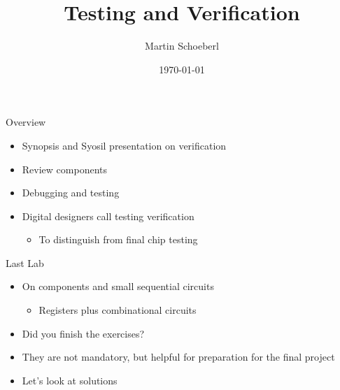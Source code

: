 

\newif\ifbook


\title{Testing and Verification}
\author{Martin Schoeberl}
\date{\today}



\begin{frame}
\titlepage
\end{frame}

\begin{frame}[fragile]{Overview}
\begin{itemize}
\item Synopsis and Syosil presentation on verification
\item Review components
\item Debugging and testing
\item Digital designers call testing verification
\begin{itemize}
\item To distinguish from final chip testing
\end{itemize}
\end{itemize}
\end{frame}

\begin{frame}[fragile]{Last Lab}
\begin{itemize}
\item On components and small sequential circuits
\begin{itemize}
\item Registers plus combinational circuits
\end{itemize}
\item Did you finish the exercises?
\item They are not mandatory, but helpful for preparation for the final project
\item Let's look at solutions
\end{itemize}
\end{frame}

